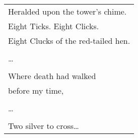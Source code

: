 \documentclass{article}
\begin{document}


\begin{center}
\begin{tabular}{l}
Heralded upon the tower's chime. \\
Eight Ticks. Eight Clicks. \\
Eight Clucks of the red-tailed hen. \\
\\
\ldots{} \\
\\
Where death had walked \\
before my time, \\
\\
\ldots{} \\
\\
Two silver to cross\ldots{} \\
\end{tabular}
\end{center}
\end{document}
